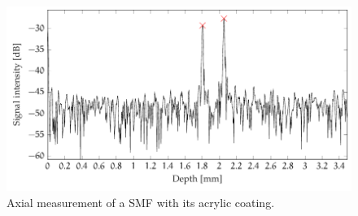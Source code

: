 \begin{figure}[t]
	\myfloatalign
	\includegraphics[width=\linewidth]{gfx/tikz/thickness-measure/fiber-thickness}
	\caption{Axial measurement of a \ac{SMF} with its acrylic coating.}\label{fig:fiber-thickness}
\end{figure}


